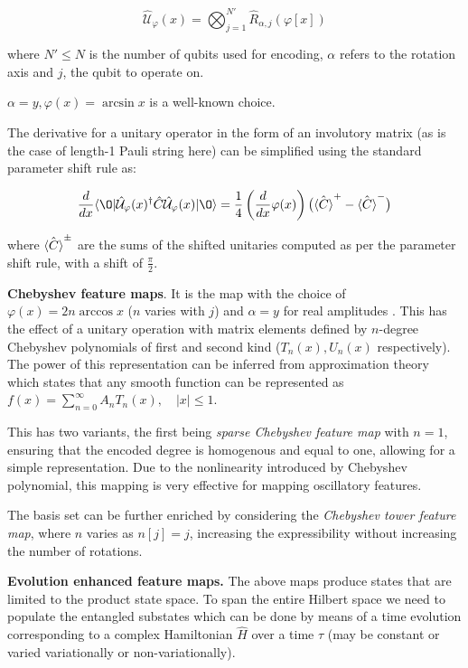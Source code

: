 \documentclass[11pt,a4paper]{article}
\begin{document}
$$\mathcal{\hat{U}}_\varphi(x) = \bigotimes_{j=1}^{N'} \hat{R}_{\alpha,j}(\varphi[x])$$

where $N' \leq N$ is the number of qubits used for encoding, $\alpha$ refers to the rotation axis and $j$, the qubit to operate on.

$\alpha = y, \varphi(x) = \arcsin x$ is a well-known choice.

The derivative for a unitary operator in the form of an involutory matrix (as is the case of length-1 Pauli string here) can be simplified using the standard parameter shift rule as:

$$
\frac{d}{dx} \langle \O | \mathcal{\hat{U}}_\varphi(x)^\dagger \hat{C} \mathcal{\hat{U}}_\varphi(x) | \O \rangle
= \frac{1}{4} \left( \frac{d}{dx} \varphi(x) \right) \big( \hat{\braket{C}}^+ - \hat{\braket{C}}^- \big)
$$

where $\hat{\braket{C}}^\pm$ are the sums of the shifted unitaries computed as per the parameter shift rule, with a shift of $\frac{\pi}{2}$.

\textbf{Chebyshev feature maps}. It is the map with the choice of $\varphi(x) = 2n \arccos x$ ($n$ varies with $j$) and $\alpha = y$ for real amplitudes . This has the effect of a unitary operation with matrix elements defined by $n$-degree Chebyshev polynomials of first and second kind ($T_n(x), U_n(x)$ respectively). The power of this representation can be inferred from approximation theory which states that any smooth function can be represented as $f(x) = \sum_{n=0}^{\infty} A_n T_n(x), \quad |x| \leq 1$.

This has two variants, the first being \textit{sparse Chebyshev feature map} with $n=1$, ensuring that the encoded degree is homogenous and equal to one, allowing for a simple representation. Due to the nonlinearity introduced by Chebyshev polynomial, this mapping is very effective for mapping oscillatory features.

The basis set can be further enriched by considering the \textit{Chebyshev tower feature map}, where $n$ varies as $n[j] = j$, increasing the expressibility without increasing the number of rotations.

\textbf{Evolution enhanced feature maps.} The above maps produce states that are limited to the product state space. To span the entire Hilbert space we need to populate the entangled substates which can be done by means of a time evolution corresponding to a complex Hamiltonian $\hat{H}$ over a time $\tau$ (may be constant or varied variationally or non-variationally).
\end{document}
